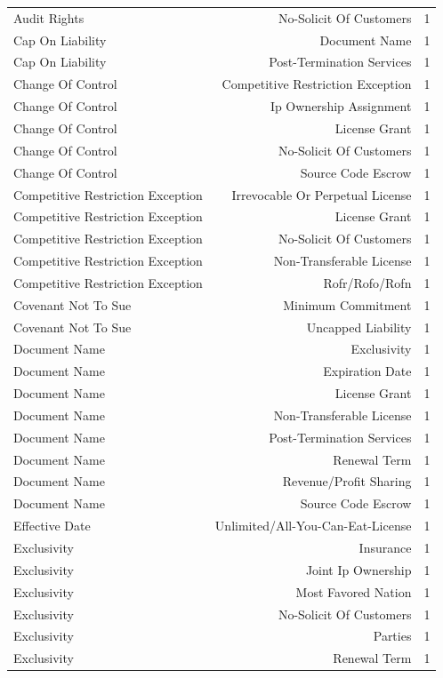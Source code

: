 \begin{tabular}{lrr}
Audit Rights & No-Solicit Of Customers & 1 \\
Cap On Liability & Document Name & 1 \\
Cap On Liability & Post-Termination Services & 1 \\
Change Of Control & Competitive Restriction Exception & 1 \\
Change Of Control & Ip Ownership Assignment & 1 \\
Change Of Control & License Grant & 1 \\
Change Of Control & No-Solicit Of Customers & 1 \\
Change Of Control & Source Code Escrow & 1 \\
Competitive Restriction Exception & Irrevocable Or Perpetual License & 1 \\
Competitive Restriction Exception & License Grant & 1 \\
Competitive Restriction Exception & No-Solicit Of Customers & 1 \\
Competitive Restriction Exception & Non-Transferable License & 1 \\
Competitive Restriction Exception & Rofr/Rofo/Rofn & 1 \\
Covenant Not To Sue & Minimum Commitment & 1 \\
Covenant Not To Sue & Uncapped Liability & 1 \\
Document Name & Exclusivity & 1 \\
Document Name & Expiration Date & 1 \\
Document Name & License Grant & 1 \\
Document Name & Non-Transferable License & 1 \\
Document Name & Post-Termination Services & 1 \\
Document Name & Renewal Term & 1 \\
Document Name & Revenue/Profit Sharing & 1 \\
Document Name & Source Code Escrow & 1 \\
Effective Date & Unlimited/All-You-Can-Eat-License & 1 \\
Exclusivity & Insurance & 1 \\
Exclusivity & Joint Ip Ownership & 1 \\
Exclusivity & Most Favored Nation & 1 \\
Exclusivity & No-Solicit Of Customers & 1 \\
Exclusivity & Parties & 1 \\
Exclusivity & Renewal Term & 1 \\

\end{tabular}
